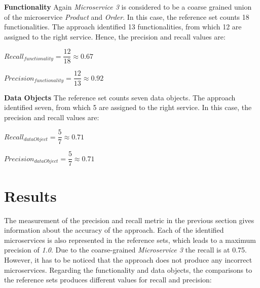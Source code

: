 \noindent
\textbf{Functionality} Again \textit{Microservice 3} is considered to be a coarse grained union of the microservice \textit{Product} and \textit{Order}. In this case, the reference set counts 18 functionalities. The approach identified 13 functionalities, from which 12 are assigned to the right service. Hence, the precision and recall values are:

\hspace{1cm}
\noindent
\begin{minipage}{.4\linewidth}
	\vspace{0.5cm}
	\flushleft
	
	
	$Recall_{functionality}=\dfrac{12}{18} \approx 0.67  $
	\vspace{0.5cm}
	
\end{minipage}%
\begin{minipage}{.5\linewidth}
	\vspace{0.5cm}
	\flushleft
	
	
	$Precision_{functionality}=\dfrac{12}{13} \approx 0.92  $
	\vspace{0.5cm}
	
\end{minipage}


\noindent
\textbf{Data Objects} The reference set counts seven data objects. The approach identified seven, from which 5 are assigned to the right service. In this case, the precision and recall values are:


\hspace{1cm}
\noindent
\begin{minipage}{.4\linewidth}
	\vspace{0.5cm}
	\flushleft
	
	
	$Recall_{dataObject}=\dfrac{5}{7} \approx 0.71  $
	\vspace{0.5cm}
	
\end{minipage}%
\begin{minipage}{.5\linewidth}
	\vspace{0.5cm}
	\flushleft
	
	
	$Precision_{dataObject}=\dfrac{5}{7} \approx 0.71  $
	\vspace{0.5cm}
	
\end{minipage}

\section{Results}
\label{sec:Evalutation:Results}
The measurement of the precision and recall metric in the previous section gives information about the accuracy of the approach. Each of the identified microservices is also represented in the reference sets, which leads to a maximum precision of \textit{1.0}. Due to the coarse-grained \textit{Microservice 3} the recall is at 0.75. However, it has to be noticed that the approach does not produce any incorrect microservices. Regarding the functionality and data objects, the comparisons to the reference sets produces different values for recall and precision:\\

